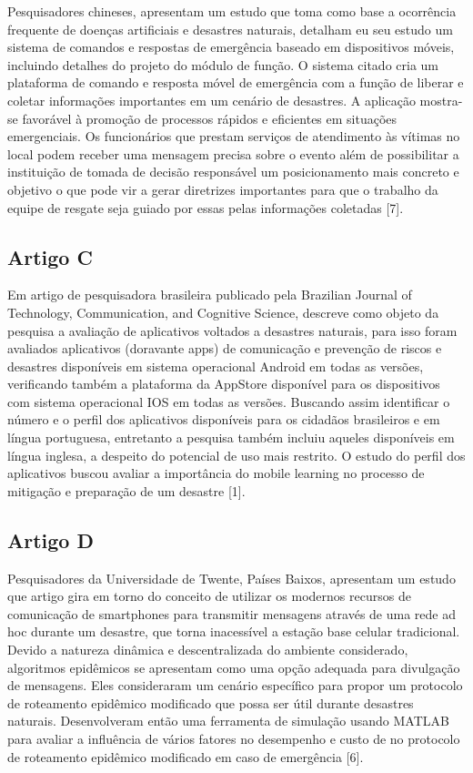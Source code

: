\documentclass[conference]{IEEEtran}
\begin{document}
Pesquisadores chineses, apresentam um estudo que toma como base a ocorrência frequente de doenças artificiais e desastres naturais, detalham eu seu estudo um sistema de comandos e respostas de emergência baseado em dispositivos móveis, incluindo detalhes do projeto do módulo de função. O sistema citado cria um plataforma de comando e resposta móvel de emergência com a função de liberar e coletar informações importantes em um cenário de desastres. A aplicação mostra-se favorável à promoção de processos rápidos e eficientes em situações emergenciais. Os funcionários que prestam serviços de atendimento às vítimas no local podem receber uma mensagem precisa sobre o evento além de possibilitar a instituição de tomada de decisão responsável um posicionamento mais concreto e objetivo o que pode vir a gerar diretrizes importantes para que o trabalho da equipe de resgate seja guiado por essas pelas informações coletadas [7].

\subsection{Artigo C}

Em artigo de pesquisadora brasileira publicado pela Brazilian Journal of Technology, Communication, and Cognitive Science, descreve como objeto da pesquisa a avaliação de aplicativos voltados a desastres naturais, para isso foram avaliados aplicativos (doravante apps) de comunicação e prevenção de riscos e desastres disponíveis em sistema operacional Android em todas as versões, verificando também a plataforma da AppStore disponível para os dispositivos com sistema operacional IOS em todas as versões. Buscando assim identificar o número e o perfil dos aplicativos disponíveis para os cidadãos brasileiros e em língua portuguesa, entretanto a pesquisa também incluiu aqueles disponíveis em língua inglesa, a despeito do potencial de uso mais restrito. O estudo do perfil dos aplicativos buscou avaliar a importância do mobile learning no processo de mitigação e preparação de um desastre [1].

\subsection{Artigo D}

Pesquisadores da Universidade de Twente, Países Baixos, apresentam um estudo que artigo gira em torno do conceito de 
utilizar os modernos recursos de comunicação de smartphones para transmitir mensagens através de uma rede ad hoc 
durante um desastre, que torna inacessível a estação base celular tradicional. Devido a natureza dinâmica e 
descentralizada do ambiente considerado, algoritmos epidêmicos se apresentam como uma opção adequada para 
divulgação de mensagens. Eles consideraram um cenário específico para propor um protocolo de roteamento 
epidêmico modificado que possa ser útil durante desastres naturais. Desenvolveram então uma ferramenta 
de simulação usando MATLAB para avaliar a influência de vários fatores no desempenho e custo de no protocolo 
de roteamento epidêmico modificado em caso de emergência [6].\newline
\end{document}
